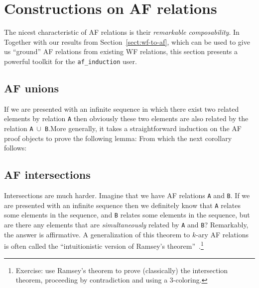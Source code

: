 \documentclass{llncs}
\begin{document}
\section{Constructions on AF relations}\label{sect:af-constructions} 

The nicest characteristic of AF relations is their {\em remarkable composability}. In 
Together with our results from Section~\ref{sect:wf-to-af}, which can be used to give us ``ground'' AF relations from existing WF relations, this section presents a powerful toolkit for the \lstinline|af_induction| user.

\subsection{AF unions}\label{ssect:union}

If we are presented with an infinite sequence in which there
exist two related elements by relation \lstinline|A| then obviously these two elements are also related 
by the relation \lstinline|A|~$\cup$~\lstinline|B|.More generally, it takes a straightforward induction on 
the AF proof objects to prove the following lemma:
%
From which the next corollary follows:

\subsection{AF intersections}\label{ssect:intersection}

Intersections are much harder. Imagine that we have AF relations \lstinline|A| and 
\lstinline|B|. If we are presented with an infinite sequence then we definitely know that 
\lstinline|A| relates some elements in the sequence, and \lstinline|B| relates some elements in 
the sequence, but are there any elements that are {\em simultaneously} related by \lstinline|A| and 
\lstinline|B|? Remarkably, the answer is affirmative. A generalization of this theorem to $k$-ary AF relations is often called 
the ``intuitionistic version of Ramsey's theorem''~\cite{Veldman01041993}.\footnote{Exercise: use Ramsey's theorem 
to prove (classically) the intersection theorem, proceeding by contradiction and using a 3-coloring.} 
\end{document}
